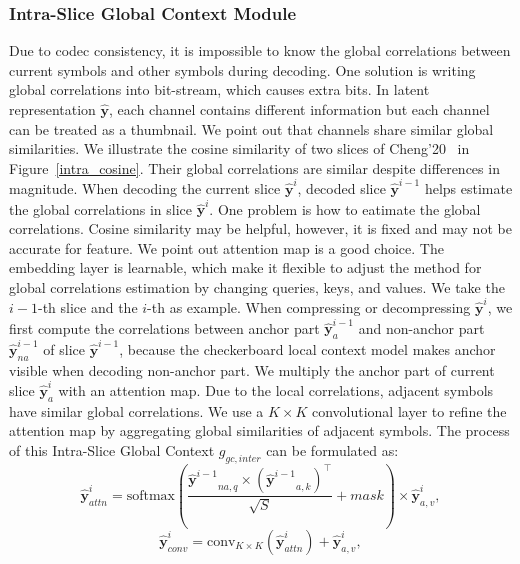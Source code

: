 \documentclass[sigconf]{acmart}
\begin{document}
\subsubsection{Intra-Slice Global Context Module}
Due to codec consistency, it is impossible to know the global correlations
between current symbols and other symbols during decoding.
One solution is writing global correlations into bit-stream,
which causes extra bits.
In latent representation $\hat{\boldsymbol{y}}$, each channel contains different information
but each channel can be treated as a thumbnail.
We point out that channels share similar global similarities.
We illustrate the cosine similarity of two slices
of Cheng'20~\cite{DBLP:conf/cvpr/ChengSTK20} in Figure~\ref{intra_cosine}.
Their global correlations are similar despite differences in magnitude.
When decoding the current slice $\hat {\boldsymbol{y}}^i$, decoded slice
$\hat {\boldsymbol{y}}^{i-1}$ helps estimate the global correlations
in slice $\hat {\boldsymbol{y}}^{i}$.
One problem is how to eatimate the global correlations.
Cosine similarity may be helpful, however, it is fixed and may not be accurate for feature.
We point out attention map is a good choice.
The embedding layer is learnable, which make it flexible
to adjust the method for global correlations estimation by changing queries, keys, and values.
We take the $i-1$-th slice and the $i$-th as example.
When compressing or decompressing $\hat {\boldsymbol{y}}^i$,
we first compute the correlations between anchor part $\hat {\boldsymbol{y}}^{i-1}_a$
and non-anchor part $\hat {\boldsymbol{y}}^{i-1}_{na}$ of slice $\hat {\boldsymbol{y}}^{i-1}$,
because the checkerboard local context model makes anchor visible when decoding non-anchor part.
We multiply the anchor part of current slice $\hat {\boldsymbol{y}}^{i}_{a}$ with
an attention map.
Due to the local correlations, adjacent symbols have similar global correlations.
We use a $K\times K$ convolutional layer to refine the attention
map by aggregating global similarities of adjacent symbols.
The process of this Intra-Slice Global Context $g_{gc, inter}$ can be formulated as:
\begin{equation}
    \hat {\boldsymbol{y}}^{i}_{attn} = \textrm{softmax}\left(\frac{{{\hat {\boldsymbol{y}}}^{i-1}}_{na,q} \times ({{\hat {\boldsymbol{y}}}^{i-1}}_{a,k})^\top}{\sqrt{S}} + mask\right) \times \hat {\boldsymbol{y}}^{i}_{a,v},
\end{equation}
\begin{equation}
    \hat {\boldsymbol{y}}^{i}_{conv} = \textrm{conv}_{K\times K}(\hat {\boldsymbol{y}}^{i}_{attn}) + \hat {\boldsymbol{y}}^{i}_{a,v},
\end{equation}
\end{document}
